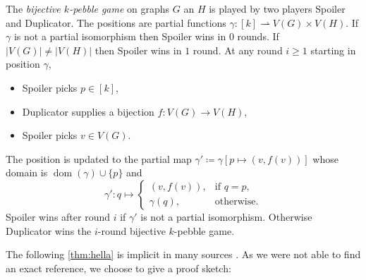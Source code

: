 \documentclass[a4paper,UKenglish,cleveref, autoref, thm-restate]{lipics-v2021}
\DeclareMathOperator{\dom}{dom}
\begin{document}
The \emph{bijective $k$-pebble game} on graphs $G$ an $H$ is played by two players Spoiler and Duplicator. The positions are partial functions $\gamma \colon [k] \rightharpoonup V(G) \times V(H)$.
If $\gamma$ is not a partial isomorphism then Spoiler wins in $0$ rounds.
If $|V(G)| \neq |V(H)|$ then Spoiler wins in $1$ round.
At any round $i \geq 1$ starting in position $\gamma$,
\begin{itemize}
	\item Spoiler picks $p \in [k]$,
	\item Duplicator supplies a bijection $f \colon V(G) \to V(H)$,
	\item Spoiler picks $v \in V(G)$.
\end{itemize}
The position is updated to the partial map $\gamma' \coloneqq \gamma[p \mapsto (v, f(v))]$ whose domain is $\dom(\gamma) \cup \{p\}$ and
\[
	\gamma' \colon q \mapsto \begin{cases}
		(v, f(v)), & \text{if } q = p,\\
		\gamma(q), & \text{otherwise}.
	\end{cases}
\]
Spoiler wins after round $i$ if $\gamma'$ is not a partial isomorphism. Otherwise Duplicator wins the $i$-round bijective $k$-pebble game.

The following \cref{thm:hella} is implicit in many sources \cite{cai_optimal_1992,hella_logical_1996}. As we were not able to find an exact reference, we choose to give a proof sketch:
\end{document}
